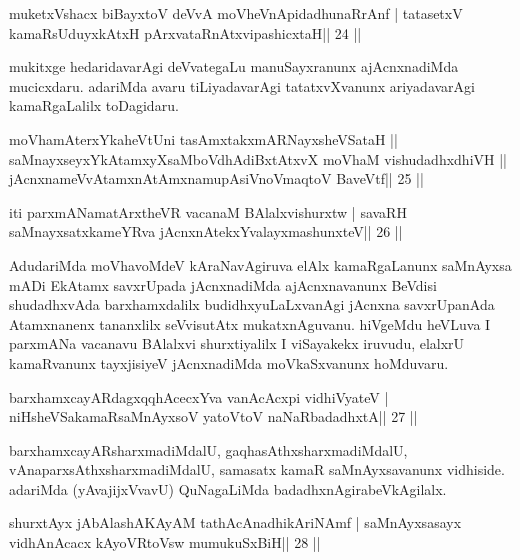 
\begin{shl}
muketxVshacx biBayxtoV deVvA moVheVnApidadhunaRrAnf |
tatasetxV kamaRsUduyxkAtxH pArxvataRnAtxvipashicxtaH\hfill || 24 ||
\end{shl}

\begin{artha}
mukitxge hedaridavarAgi deVvategaLu manuSayxranunx ajAcnxnadiMda mucicxdaru. adariMda avaru tiLiyadavarAgi tatatxvXvanunx ariyadavarAgi kamaRgaLalilx toDagidaru.
\end{artha}

\begin{shl}
moVhamAterxYkaheVtUni tasAmxtakxmARNayxsheVSataH ||
saMnayxseyxYkAtamxyXsaMboVdhAdiBxtAtxvX moVhaM vishudadhxdhiVH ||
jAcnxnameVvA\s\s tamxnA\s\s tAmxnamupAsiVnoV\s maqtoV BaveVtf\hfill || 25 ||
\end{shl}

\begin{shl}
iti parxmANamatArxtheVR vacanaM BAlalxvishurxtw |
savaRH saMnayxsatxkameYRva jAcnxnAtekxYvalayxmashunxteV\hfill || 26 ||
\end{shl}

\begin{artha}
AdudariMda moVhavoMdeV kAraNavAgiruva elAlx kamaRgaLanunx saMnAyxsa mADi EkAtamx savxrUpada jAcnxnadiMda ajAcnxnavanunx BeVdisi shudadhxvAda barxhamxdalilx budidhxyuLaLxvanAgi jAcnxna savxrUpanAda Atamxnanenx tananxlilx seVvisutAtx mukatxnAguvanu. hiVgeMdu heVLuva I parxmANa vacanavu BAlalxvi shurxtiyalilx I viSayakekx iruvudu, elalxrU kamaRvanunx tayxjisiyeV jAcnxnadiMda moVkaSxvanunx hoMduvaru.
\end{artha}


\begin{shl}
barxhamxcayARdagxqqhAcecxYva vanAcAcxpi vidhiVyateV |
niHsheVSakamaRsaMnAyxsoV yatoV\s toV naNaRbadadhxtA\hfill || 27 ||
\end{shl}

\begin{artha}
barxhamxcayARsharxmadiMdalU, gaqhasAthxsharxmadiMdalU,  vAnaparxsAthxsharxmadiMdalU, samasatx kamaR saMnAyxsavanunx vidhiside. adariMda (yAvajijxVvavU) QuNagaLiMda badadhxnAgirabeVkAgilalx.
\end{artha}

\begin{shl}
\footnotemark[1]shurxtAyx jAbAlashAKAyAM tathAcAnadhikAriNAmf |
saMnAyxsasayx vidhAnAcacx kAyoVR\s toV\s sw mumukuSxBiH\hfill || 28 ||
\end{shl}

